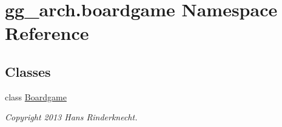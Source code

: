 \hypertarget{namespacegg__arch_1_1boardgame}{\section{gg\-\_\-arch.\-boardgame Namespace Reference}
\label{namespacegg__arch_1_1boardgame}
}
\subsection*{Classes}
\begin{DoxyCompactItemize}
\item 
class \hyperlink{classgg__arch_1_1boardgame_1_1_boardgame}{Boardgame}
\begin{DoxyCompactList}\small\item\em Copyright 2013 Hans Rinderknecht. \end{DoxyCompactList}\end{DoxyCompactItemize}
